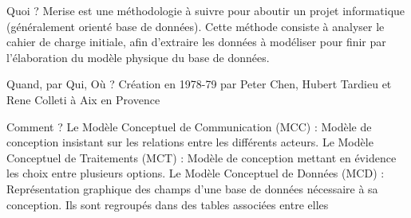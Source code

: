 \documentclass{beamer}
\begin{document}
    \begin{frame}
        Quoi ?
    \newline
    \newline
        Merise est une méthodologie à suivre pour aboutir un projet informatique (généralement orienté base de données).
    \newline
    \newline
        Cette méthode consiste à analyser le cahier de charge initiale,
        afin d'extraire les données à modéliser pour finir par l'élaboration du modèle physique du base de données.
    \end{frame}

    \begin{frame}
        Quand, par Qui, Où ?
        \newline
        \newline
        Création en 1978-79 par Peter Chen, Hubert Tardieu et Rene Colleti à Aix en Provence
    \end{frame}

    \begin{frame}

        Comment ?
    \newline
    \newline
        Le Modèle Conceptuel de Communication (MCC) :
    \newline
        Modèle de conception insistant sur les relations entre les différents acteurs.
    \newline
    \newline
        Le Modèle Conceptuel de Traitements (MCT) :
    \newline
        Modèle de conception mettant en évidence les choix entre plusieurs options.
    \newline
    \newline
        Le Modèle Conceptuel de Données (MCD) :
    \newline
        Représentation graphique des champs d'une base de données nécessaire à sa conception.
    \newline
        Ils sont regroupés dans des tables associées entre elles

    \end{frame}
\end{document}
